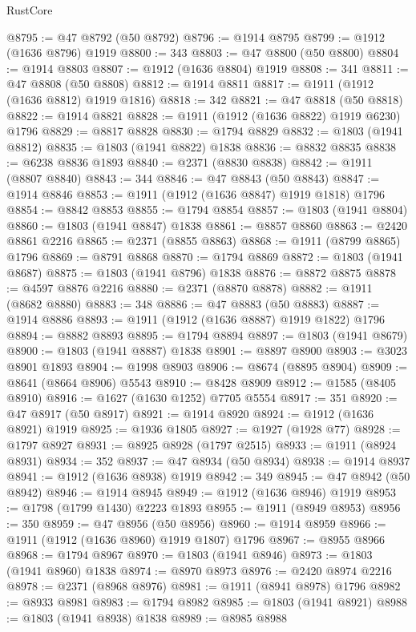 \begin{lexlean}{RustCore}
\begin{coremodule}
@8795 := @47 @8792 (@50 @8792)
@8796 := @1914 @8795
@8799 := @1912 (@1636 @8796) @1919
@8800 := 343
@8803 := @47 @8800 (@50 @8800)
@8804 := @1914 @8803
@8807 := @1912 (@1636 @8804) @1919
@8808 := 341
@8811 := @47 @8808 (@50 @8808)
@8812 := @1914 @8811
@8817 := @1911 (@1912 (@1636 @8812) @1919 @1816)
@8818 := 342
@8821 := @47 @8818 (@50 @8818)
@8822 := @1914 @8821
@8828 := @1911 (@1912 (@1636 @8822) @1919 @6230) @1796
@8829 := @8817 @8828
@8830 := @1794 @8829
@8832 := @1803 (@1941 @8812)
@8835 := @1803 (@1941 @8822) @1838
@8836 := @8832 @8835
@8838 := @6238 @8836 @1893
@8840 := @2371 (@8830 @8838)
@8842 := @1911 (@8807 @8840)
@8843 := 344
@8846 := @47 @8843 (@50 @8843)
@8847 := @1914 @8846
@8853 := @1911 (@1912 (@1636 @8847) @1919 @1818) @1796
@8854 := @8842 @8853
@8855 := @1794 @8854
@8857 := @1803 (@1941 @8804)
@8860 := @1803 (@1941 @8847) @1838
@8861 := @8857 @8860
@8863 := @2420 @8861 @2216
@8865 := @2371 (@8855 @8863)
@8868 := @1911 (@8799 @8865) @1796
@8869 := @8791 @8868
@8870 := @1794 @8869
@8872 := @1803 (@1941 @8687)
@8875 := @1803 (@1941 @8796) @1838
@8876 := @8872 @8875
@8878 := @4597 @8876 @2216
@8880 := @2371 (@8870 @8878)
@8882 := @1911 (@8682 @8880)
@8883 := 348
@8886 := @47 @8883 (@50 @8883)
@8887 := @1914 @8886
@8893 := @1911 (@1912 (@1636 @8887) @1919 @1822) @1796
@8894 := @8882 @8893
@8895 := @1794 @8894
@8897 := @1803 (@1941 @8679)
@8900 := @1803 (@1941 @8887) @1838
@8901 := @8897 @8900
@8903 := @3023 @8901 @1893
@8904 := @1998 @8903
@8906 := @8674 (@8895 @8904)
@8909 := @8641 (@8664 @8906) @5543
@8910 := @8428 @8909
@8912 := @1585 (@8405 @8910)
@8916 := @1627 (@1630 @1252) @7705 @5554
@8917 := 351
@8920 := @47 @8917 (@50 @8917)
@8921 := @1914 @8920
@8924 := @1912 (@1636 @8921) @1919
@8925 := @1936 @1805
@8927 := @1927 (@1928 @77)
@8928 := @1797 @8927
@8931 := @8925 @8928 (@1797 @2515)
@8933 := @1911 (@8924 @8931)
@8934 := 352
@8937 := @47 @8934 (@50 @8934)
@8938 := @1914 @8937
@8941 := @1912 (@1636 @8938) @1919
@8942 := 349
@8945 := @47 @8942 (@50 @8942)
@8946 := @1914 @8945
@8949 := @1912 (@1636 @8946) @1919
@8953 := @1798 (@1799 @1430) @2223 @1893
@8955 := @1911 (@8949 @8953)
@8956 := 350
@8959 := @47 @8956 (@50 @8956)
@8960 := @1914 @8959
@8966 := @1911 (@1912 (@1636 @8960) @1919 @1807) @1796
@8967 := @8955 @8966
@8968 := @1794 @8967
@8970 := @1803 (@1941 @8946)
@8973 := @1803 (@1941 @8960) @1838
@8974 := @8970 @8973
@8976 := @2420 @8974 @2216
@8978 := @2371 (@8968 @8976)
@8981 := @1911 (@8941 @8978) @1796
@8982 := @8933 @8981
@8983 := @1794 @8982
@8985 := @1803 (@1941 @8921)
@8988 := @1803 (@1941 @8938) @1838
@8989 := @8985 @8988

\end{coremodule}
\end{lexlean}
